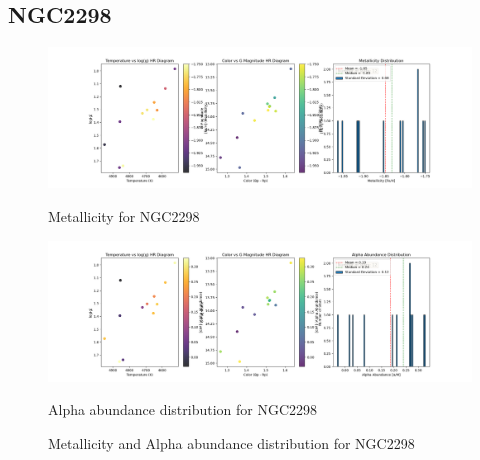 \documentclass[a4paper,12pt]{article}
\begin{document}
\subsection{NGC2298}
\begin{figure}[H]
    \centering
    \begin{minipage}[b]{0.8\textwidth}
        \centering
        \includegraphics[width=\textwidth]{NGC2298_metalicity.png}
        \caption{Metallicity for NGC2298}
        \label{fig:NGC2298_metalicity}
    \end{minipage}
    \hfill
    \begin{minipage}[b]{0.8\textwidth}
        \centering
        \includegraphics[width=\textwidth]{NGC2298_alpha.png}
        \caption{Alpha abundance distribution for NGC2298}
        \label{fig:NGC2298_alpha}
    \end{minipage}
    \caption{Metallicity and Alpha abundance distribution for NGC2298}
    \label{fig:NGC2298_combined}
\end{figure}
\clearpage
\end{document}

